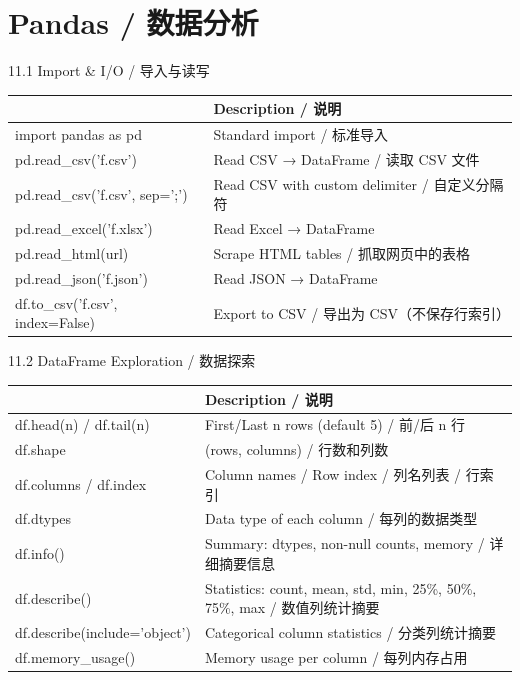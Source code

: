 \documentclass[11pt,a4paper]{report}
\begin{document}
\newpage

\chapter{Pandas / 数据分析}

\begin{cmdsection}{11.1  Import \& I/O / 导入与读写}
\normalsize\renewcommand{\arraystretch}{1.4}
\centering
\begin{tabularx}{\textwidth}{@{}>{\ttfamily}l>{\raggedright\arraybackslash}X@{}}
\toprule
\multicolumn{1}{@{}l}{\textbf{Syntax}} & \textbf{Description / 说明} \\ \midrule
import pandas as pd          & Standard import / 标准导入 \\
pd.read\_csv('f.csv')        & Read CSV → DataFrame / 读取 CSV 文件 \\
pd.read\_csv('f.csv', sep=';') & Read CSV with custom delimiter / 自定义分隔符 \\
pd.read\_excel('f.xlsx')     & Read Excel → DataFrame \\
pd.read\_html(url)           & Scrape HTML tables / 抓取网页中的表格 \\
pd.read\_json('f.json')      & Read JSON → DataFrame \\
df.to\_csv('f.csv', index=False) & Export to CSV / 导出为 CSV（不保存行索引） \\
\bottomrule
\end{tabularx}
\end{cmdsection}

\begin{cmdsection}{11.2  DataFrame Exploration / 数据探索}
\normalsize\renewcommand{\arraystretch}{1.4}
\centering
\begin{tabularx}{\textwidth}{@{}>{\ttfamily}l>{\raggedright\arraybackslash}X@{}}
\toprule
\multicolumn{1}{@{}l}{\textbf{Syntax}} & \textbf{Description / 说明} \\ \midrule
df.head(n) / df.tail(n)     & First/Last n rows (default 5) / 前/后 n 行 \\
df.shape                    & (rows, columns) / 行数和列数 \\
df.columns / df.index       & Column names / Row index / 列名列表 / 行索引 \\
df.dtypes                   & Data type of each column / 每列的数据类型 \\
df.info()                   & Summary: dtypes, non-null counts, memory / 详细摘要信息 \\
df.describe()               & Statistics: count, mean, std, min, 25\%, 50\%, 75\%, max / 数值列统计摘要 \\
df.describe(include='object') & Categorical column statistics / 分类列统计摘要 \\
df.memory\_usage()           & Memory usage per column / 每列内存占用 \\
\bottomrule
\end{tabularx}
\end{cmdsection}
\end{document}
